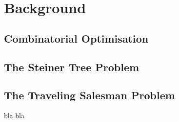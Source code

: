 \chapter{Background}
\label{chap:BG}
\section{Combinatorial Optimisation}
\label{sec:CO}
\section{The Steiner Tree Problem}
\label{sec:STP}

\section{The Traveling Salesman Problem}
\label{sec:TSP}

bla bla
